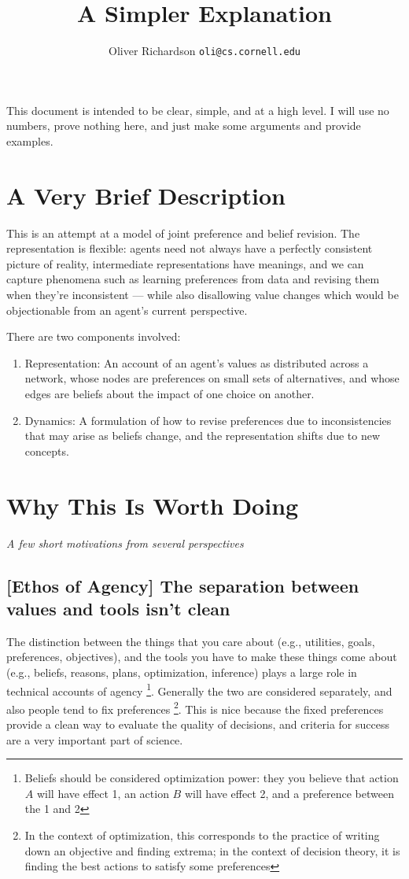 \documentclass{article}
\title{A Simpler Explanation}
\author{Oliver Richardson  \texttt{oli@cs.cornell.edu}}
\begin{document}
	This document is intended to be clear, simple, and at a high level. %
	I will use no numbers, prove nothing here, and just make some arguments and provide examples.
	
	\section{A Very Brief Description}
	This is an attempt at a model of joint preference and belief revision. The representation is flexible: agents need not always have a perfectly consistent picture of reality, intermediate representations have meanings, and we can capture phenomena such as learning preferences from data and revising them when they're inconsistent --- while also disallowing value changes which would be objectionable from an agent's current perspective.
	
	There are two components involved: 
	\begin{enumerate}[nosep]
		\item Representation: An account of an agent's values as distributed across a network, whose nodes are preferences on small sets of alternatives, and whose edges are beliefs about the impact of one choice on another.
		\item Dynamics: A formulation of how to revise preferences due to inconsistencies that may arise as beliefs change, and the representation shifts due to new concepts.
	\end{enumerate}
		

	\section{Why This Is Worth Doing}
	\vspace{-1em}
	\textit{A few short motivations from several perspectives}
	
	\subsection*{[Ethos of Agency] The separation between values and tools isn't clean}
	The distinction between the things that you care about (e.g., utilities, goals, preferences, objectives), and the tools you have to make these things come about (e.g., beliefs, reasons, plans, optimization, inference) plays a large role in technical accounts of agency%
	\footnote{Beliefs should be considered optimization power: they you believe that action $A$ will have effect 1, an action $B$ will have effect 2, and a preference between the 1 and 2}. Generally the two are considered separately, and also people tend to fix preferences%
	\footnote{In the context of optimization, this corresponds to the practice of writing down an objective and finding extrema; in the context of decision theory, it is finding the best actions to satisfy some preferences}. This is nice because the fixed preferences provide a clean way to evaluate the quality of decisions, and criteria for success are a very important part of science.
	
\end{document}
